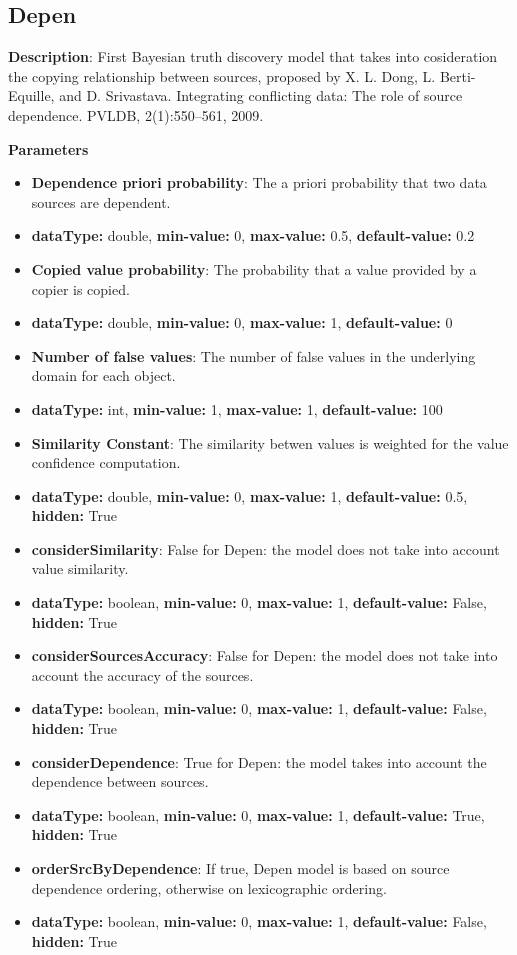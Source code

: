 \documentclass[a4paper,10pt]{scrartcl}
\begin{document}
\subsection{Depen}
\begin{description}
\item \textbf{Description}: First Bayesian truth discovery model that takes into cosideration the copying relationship between sources, proposed by X. L. Dong, L. Berti-Equille, and D. Srivastava. Integrating conflicting data: The role of source dependence. PVLDB, 2(1):550–561, 2009.
\item \textbf{Parameters}
\begin{itemize}
\item \textbf{Dependence priori probability}: The a priori probability that two data sources are dependent.
\item[]\textbf{dataType: }double, \textbf{min-value: }0, \textbf{max-value: }0.5, \textbf{default-value: }0.2\item \textbf{Copied value probability}: The probability that a value provided by a copier is copied.
\item[]\textbf{dataType: }double, \textbf{min-value: }0, \textbf{max-value: }1, \textbf{default-value: }0\item \textbf{Number of false values}: The number of false values in the underlying domain for each object.
\item[]\textbf{dataType: }int, \textbf{min-value: }1, \textbf{max-value: }1, \textbf{default-value: }100\item \textbf{Similarity Constant}: The similarity betwen values is weighted for the value confidence computation.
\item[]\textbf{dataType: }double, \textbf{min-value: }0, \textbf{max-value: }1, \textbf{default-value: }0.5, \textbf{hidden: }True
\item \textbf{considerSimilarity}: False for Depen: the model does not take into account value similarity.
\item[]\textbf{dataType: }boolean, \textbf{min-value: }0, \textbf{max-value: }1, \textbf{default-value: }False, \textbf{hidden: }True
\item \textbf{considerSourcesAccuracy}: False for Depen: the model does not take into account the accuracy of the sources.
\item[]\textbf{dataType: }boolean, \textbf{min-value: }0, \textbf{max-value: }1, \textbf{default-value: }False, \textbf{hidden: }True
\item \textbf{considerDependence}: True for Depen: the model takes into account the dependence between sources.
\item[]\textbf{dataType: }boolean, \textbf{min-value: }0, \textbf{max-value: }1, \textbf{default-value: }True, \textbf{hidden: }True
\item \textbf{orderSrcByDependence}: If true, Depen model is based on source dependence ordering, otherwise on lexicographic ordering.
\item[]\textbf{dataType: }boolean, \textbf{min-value: }0, \textbf{max-value: }1, \textbf{default-value: }False, \textbf{hidden: }True
\end{itemize}
\end{description}
\end{document}

